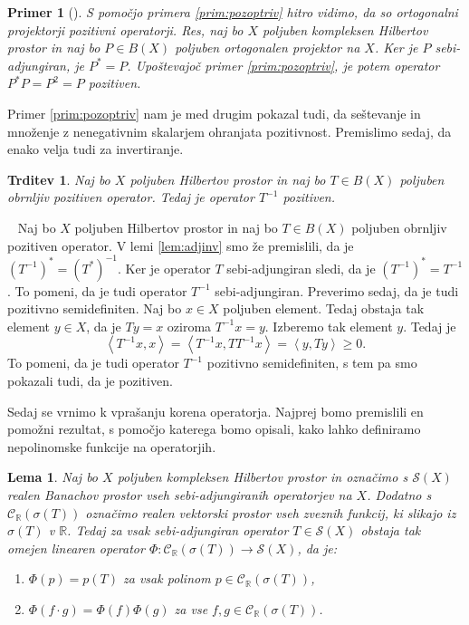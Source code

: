 \documentclass[12pt,a4paper,oneside,fleqn,openany]{book}
\newtheorem{lema}[izrek]{Lema}
\newtheorem{trditev}[izrek]{Trditev}
\newtheorem{primer*}[izrek]{Primer}
\newcommand{\eopf}{\raisebox{0.8ex}{\framebox{}}} %
\newenvironment{dokaz}%
{\noindent{\bf Dokaz.}\ }%
{\hfill\eopf\par\bigskip}%
\newenvironment{primer}[1][]{\begin{primer*}[#1]\renewcommand*{\qedsymbol}{$\diamondsuit$}\pushQED{\qed}}{\popQED\end{primer*}}
\newcommand{\R}{\mathbb{R}}
\newcommand{\Sp}[2]{\ensuremath{\left<#1, #2\right>}}
\newcommand{\map}[3]{\ensuremath{{#1}:{#2}\rightarrow{#3}}}
\begin{document}
\begin{primer}
	\label{prim:ortogprojsopoz}
	S pomočjo primera \ref{prim:pozoptriv} hitro vidimo, da so ortogonalni projektorji pozitivni operatorji. Res, naj bo $X$ poljuben kompleksen Hilbertov prostor in naj bo $P\in B(X)$ poljuben ortogonalen projektor na $X$. Ker je $P$ sebi-adjungiran, je $P^* = P$. Upoštevajoč primer \ref{prim:pozoptriv}, je potem operator $P^*P = P^2 = P$ pozitiven.
\end{primer}

Primer \ref{prim:pozoptriv} nam je med drugim pokazal tudi, da seštevanje in množenje z nenegativnim skalarjem ohranjata pozitivnost. Premislimo sedaj, da enako velja tudi za invertiranje.
\begin{trditev}
	\label{trd:pozinv}
	Naj bo $X$ poljuben Hilbertov prostor in naj bo $T\in B(X)$ poljuben obrnljiv pozitiven operator. Tedaj je operator $T^{-1}$ pozitiven.
\end{trditev}
\begin{dokaz}
	Naj bo $X$ poljuben Hilbertov prostor in naj bo $T\in B(X)$ poljuben obrnljiv pozitiven operator. V lemi \ref{lem:adjinv} smo že premislili, da je $(T^{-1})^* = (T^*)^{-1}$. Ker je operator $T$ sebi-adjungiran sledi, da je $(T^{-1})^* = T^{-1}$. To pomeni, da je tudi operator $T^{-1}$ sebi-adjungiran. Preverimo sedaj, da je tudi pozitivno semidefiniten. Naj bo $x\in X$ poljuben element. Tedaj obstaja tak element $y\in X$, da je $Ty = x$ oziroma $T^{-1}x = y$. Izberemo tak element $y$. Tedaj je $$\Sp{T^{-1}x}{x} = \Sp{T^{-1}x}{TT^{-1}x}= \Sp{y}{Ty}\geq 0.$$
	To pomeni, da je tudi operator $T^{-1}$ pozitivno semidefiniten, s tem pa smo pokazali tudi, da je pozitiven.
\end{dokaz}

Sedaj se vrnimo k vprašanju korena operatorja. Najprej bomo premislili en pomožni rezultat, s pomočjo katerega bomo opisali, kako lahko definiramo nepolinomske funkcije na operatorjih.

\begin{lema}
	\label{lem:sebiadjPhi}
	Naj bo $X$ poljuben kompleksen Hilbertov prostor in označimo s $\mathcal{S}(X)$ realen Banachov prostor vseh sebi-adjungiranih operatorjev na $X$. Dodatno s $\mathcal{C}_\R(\sigma(T))$ označimo realen vektorski prostor vseh zveznih funkcij, ki slikajo iz $\sigma(T)$ v $\R$. Tedaj za vsak sebi-adjungiran operator $T\in \mathcal{S}(X)$ obstaja tak omejen linearen operator $\map{\Phi}{\mathcal{C}_\R(\sigma(T))}{\mathcal{S}(X)}$, da je: \begin{enumerate}
		\item $\Phi(p) = p(T)$ za vsak polinom $p\in\mathcal{C}_\R(\sigma(T))$,
		\item $\Phi(f\cdot g) = \Phi(f)\Phi(g)$ za vse $f, g\in \mathcal{C}_\R(\sigma(T))$.
	\end{enumerate}
\end{lema}
\end{document}
